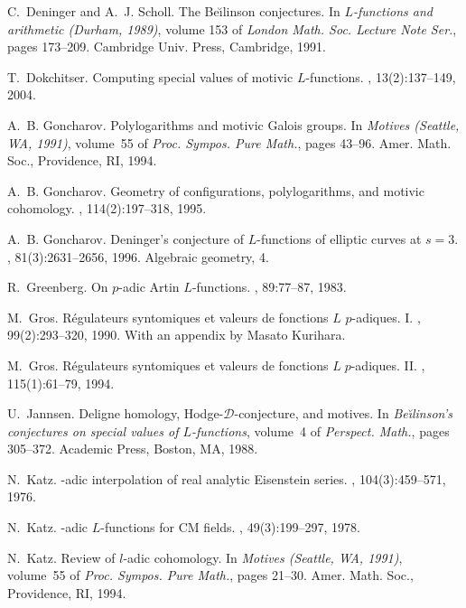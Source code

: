 \documentclass{amsart}
\begin{document}
\begin{thebibliography}{10}
C.~Deninger and A.~J. Scholl.
\newblock The {B}e\u\i linson conjectures.
\newblock In {\em $L$-functions and arithmetic (Durham, 1989)}, volume 153 of
  {\em London Math. Soc. Lecture Note Ser.}, pages 173--209. Cambridge Univ.
  Press, Cambridge, 1991.

T.~Dokchitser.
\newblock Computing special values of motivic ${L}$-functions.
, 13(2):137--149, 2004.

A.~B. Goncharov.
\newblock Polylogarithms and motivic {G}alois groups.
\newblock In {\em Motives (Seattle, WA, 1991)}, volume~55 of {\em Proc. Sympos.
  Pure Math.}, pages 43--96. Amer. Math. Soc., Providence, RI, 1994.

A.~B. Goncharov.
\newblock Geometry of configurations, polylogarithms, and motivic cohomology.
, 114(2):197--318, 1995.

A.~B. Goncharov.
\newblock Deninger's conjecture of {$L$}-functions of elliptic curves at
  {$s=3$}.
, 81(3):2631--2656, 1996.
\newblock Algebraic geometry, 4.

R.~Greenberg.
\newblock On {$p$}-adic {A}rtin {$L$}-functions.
, 89:77--87, 1983.

M.~Gros.
\newblock R\'egulateurs syntomiques et valeurs de fonctions ${L}$ $p$-adiques.
  {I}.
, 99(2):293--320, 1990.
\newblock With an appendix by Masato Kurihara.

M.~Gros.
\newblock R\'egulateurs syntomiques et valeurs de fonctions ${L}\;p$-adiques.
  {I}{I}.
, 115(1):61--79, 1994.

U.~Jannsen.
\newblock Deligne homology, {H}odge-{${\mathcal D}$}-conjecture, and motives.
\newblock In {\em Be\u\i linson's conjectures on special values of
  $L$-functions}, volume~4 of {\em Perspect. Math.}, pages 305--372. Academic
  Press, Boston, MA, 1988.

N.~Katz.
-adic interpolation of real analytic {E}isenstein series.
, 104(3):459--571, 1976.

N.~Katz.
-adic {$L$}-functions for {CM} fields.
, 49(3):199--297, 1978.

N.~Katz.
\newblock Review of {$l$}-adic cohomology.
\newblock In {\em Motives (Seattle, WA, 1991)}, volume~55 of {\em Proc. Sympos.
  Pure Math.}, pages 21--30. Amer. Math. Soc., Providence, RI, 1994.


\end{thebibliography}
\end{document}
